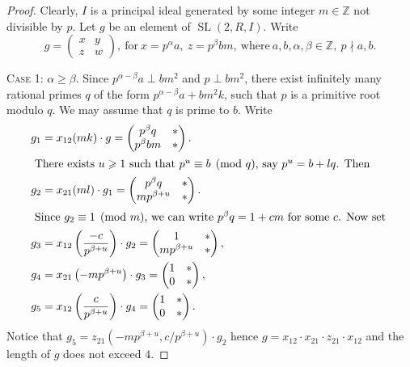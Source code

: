 \documentclass[oneside, 12pt]{amsart}
\theoremstyle{plain}
\numberwithin{equation}{section}
\numberwithin{lemma}{section}
\theoremstyle{definition}
\theoremstyle{remark}
\DeclareMathOperator{\SL}{SL}
\begin{document}
\begin{proof}
Clearly, $I$ is a principal ideal generated by some integer $m\in\mathbb{Z}$ not divisible by $p$.
Let $g$ be an element of $\SL(2,R,I)$. Write
\[ g=\begin{pmatrix}x & y \\ z & w\end{pmatrix},\ \text{for}\ x=p^\alpha a,\ z=p^\beta bm,\ \text{where}\ a,b,\alpha,\beta\in\mathbb{Z},\ p\nmid a,b. \]

\textsc{Case 1:} $\alpha\geqslant\beta$. 
Since $p^{\alpha-\beta}a\perp bm^2$ and $p\perp bm^2$, there exist infinitely many rational primes $q$ of the form $p^{\alpha-\beta}a+bm^2k$,
such that $p$ is a primitive root modulo $q$. 
We may assume that $q$ is prime to $b$. 
Write
\begin{align*}
g_1 & = x_{12}(mk)\cdot g =
\begin{pmatrix} p^\beta q & * \\ p^\beta bm & * \end{pmatrix}. \\
\intertext{
There exists $u\geqslant 1$ such that $p^u\equiv b\pmod q$, say $p^u=b+lq$. Then
}
g_2 & = x_{21}(ml)\cdot g_1 =
\begin{pmatrix} p^\beta q & * \\ mp^{\beta+u} & * \end{pmatrix}. \\
\intertext{
Since $g_2\equiv 1\pmod m$, we can write $p^\beta q=1+cm$ for some $c$. Now set
}
g_3 & = x_{12}\left(\dfrac{-c}{p^{\beta+u}}\right)\cdot g_2 =
\begin{pmatrix} 1 & * \\ mp^{\beta+u} & * \end{pmatrix}, \\
g_4 & = x_{21}\left(-mp^{\beta+u}\right)\cdot g_3 =
\begin{pmatrix} 1 & * \\ 0 & * \end{pmatrix}, \\
g_5 & = x_{12}\left(\dfrac{c}{p^{\beta+u}}\right)\cdot g_4 =
\begin{pmatrix} 1 & * \\ 0 & * \end{pmatrix}.
\end{align*}
Notice that $g_5=z_{21}\left(-mp^{\beta+u}, c/p^{\beta+u}\right)\cdot g_2$ hence $g=x_{12} \cdot x_{21} \cdot z_{21} \cdot x_{12}$
and the length of $g$ does not exceed $4$.


\end{proof}
\end{document}

